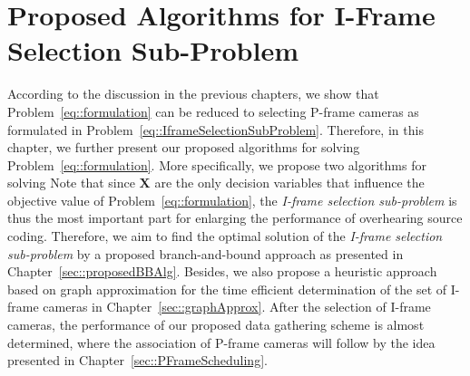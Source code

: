 \section{Proposed Algorithms for I-Frame Selection Sub-Problem}
\label{sec::proposedAlgs}
%
According to the discussion in the previous chapters, we show that Problem~\eqref{eq::formulation} can be reduced to selecting P-frame cameras as formulated in Problem~\eqref{eq::IframeSelectionSubProblem}.
Therefore, in this chapter, we further present our proposed algorithms for solving Problem~\eqref{eq::formulation}.
More specifically, we propose two algorithms for solving
Note that since $\mathbf{X}$ are the only decision variables that influence the objective value of Problem~\eqref{eq::formulation}, the \emph{I-frame selection sub-problem} is thus the most important part for enlarging the performance of overhearing source coding.
Therefore, we aim to find the optimal solution of the \emph{I-frame selection sub-problem} by a proposed branch-and-bound approach as presented in Chapter~\ref{sec::proposedBBAlg}.
Besides, we also propose a heuristic approach based on graph approximation for the time efficient determination of the set of I-frame cameras in Chapter~\ref{sec::graphApprox}.
After the selection of I-frame cameras, the performance of our proposed data gathering scheme is almost determined, where the association of P-frame cameras will follow by the idea presented in Chapter~\ref{sec::PFrameScheduling}.

